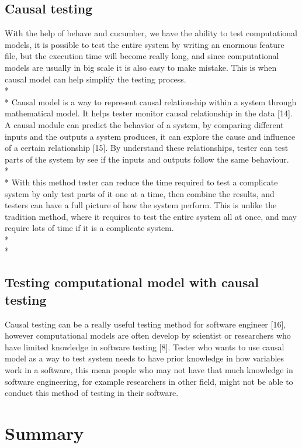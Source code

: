 \subsection{Causal testing}
With the help of behave and cucumber, we have the ability to test computational models, it is possible to test the entire system by writing an enormous feature file, but the execution time will become really long, and since computational models are usually in big scale it is also easy to make mistake. This is when causal model can help simplify the testing process. \\*\\*
Causal model is a way to represent causal relationship within a system through mathematical model. It helps tester monitor causal relationship in the data [14]. A causal module can predict the behavior of a system, by comparing different inputs and the outputs a system produces, it can explore the cause and influence of a certain relationship [15]. By understand these relationships, tester can test parts of the system by see if the inputs and outputs follow the same behaviour. \\*\\*
With this method tester can reduce the time required to test a complicate system by only test parts of it one at a time, then combine the results, and testers can have a full picture of how the system perform. This is unlike the tradition method, where it requires to test the entire system all at once, and may require lots of time if it is a complicate system. \\*\\*

\subsection{Testing computational model with causal testing}
Causal testing can be a really useful testing method for software engineer [16], however computational models are often develop by scientist or researchers who have limited knowledge in software testing [8]. Tester who wants to use causal model as a way to test system needs to have prior knowledge in how variables work in a software, this mean people who may not have that much knowledge in software engineering, for example researchers in other field, might not be able to conduct this method of testing in their software.


\section{Summary}

